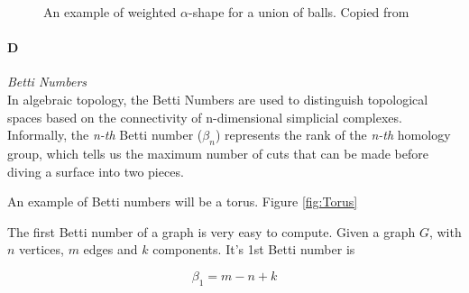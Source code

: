 \documentclass[11pt]{article}
\begin{document}
\begin{figure}
	\caption{\label{fig:Dual Shape} An example of weighted $\alpha$-shape for a union of balls. Copied from \cite{DualShape}}
\end{figure}

\paragraph{D} \emph{Betti Numbers} \hfill \\
\indent In algebraic topology, the Betti Numbers are used to distinguish topological spaces based on the connectivity of n-dimensional simplicial complexes. Informally, the \emph{n-th} Betti number ($\beta_n$) represents the rank of the \emph{n-th} homology group, which tells us the maximum number of cuts that can be made before diving a surface into two pieces. \cite{betti wiki}

\indent An example of Betti numbers will be a torus. Figure \ref{fig:Torus}

\indent The first Betti number of a graph is very easy to compute. Given a graph $G$, with $n$ vertices, $m$ edges and $k$ components. It's 1st Betti number is

\begin{equation}
\beta_1 = m - n + k
\end{equation}
\end{document}
